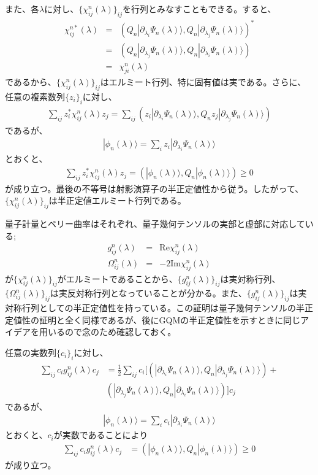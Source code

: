\documentclass[12pt]{jsbook}
\newcommand{\ra}{\rangle}
\newcommand{\pa}{\partial}
\begin{document}
また、各$\lambda$に対し、$\{\chi^{n}_{ij}(\lambda)\}_{ij}$を行列とみなすこともできる。すると、
\begin{eqnarray}
\chi^{n*}_{ij}(\lambda)&=&(Q_n|\pa_{\lambda_i}\Psi_n(\lambda)\ra,Q_n|\pa_{\lambda_j}\Psi_n(\lambda)\ra)^*\\
&=&(Q_n|\pa_{\lambda_j}\Psi_n(\lambda)\ra,Q_n|\pa_{\lambda_i}\Psi_n(\lambda)\ra)\\
&=&\chi^{n}_{ji}(\lambda)
\end{eqnarray}
であるから、$\{\chi^{n}_{ij}(\lambda)\}_{ij}$はエルミート行列、特に固有値は実である。さらに、任意の複素数列$\{z_i\}_i$に対し、
\begin{eqnarray}
\displaystyle \sum_{ij} z_i^{*}\chi^{n}_{ij}(\lambda)z_j=\displaystyle \sum_{ij} (z_i|\pa_{\lambda_i}\Psi_n(\lambda)\ra,Q_n z_j|\pa_{\lambda_j}\Psi_n(\lambda)\ra)
\end{eqnarray}
であるが、
\begin{eqnarray}
|\phi_n(\lambda)\ra = \displaystyle \sum_{i} z_i|\pa_{\lambda_i}\Psi_n(\lambda)\ra
\end{eqnarray}
とおくと、
\begin{eqnarray}
\label{SPDsingle}
\displaystyle \sum_{ij} z_i^{*}\chi^{n}_{ij}(\lambda)z_j=(|\phi_n(\lambda)\ra,Q_n|\phi_n(\lambda)\ra)\geq 0
\end{eqnarray}
が成り立つ。最後の不等号は射影演算子の半正定値性から従う。したがって、$\{\chi^{n}_{ij}(\lambda)\}_{ij}$は半正定値エルミート行列である。

量子計量とベリー曲率はそれぞれ、量子幾何テンソルの実部と虚部に対応している;
\begin{eqnarray}
    g^{n}_{ij}(\lambda)&=&\mathrm{Re} \chi^{n}_{ij}(\lambda)\\
    \Omega^n_{ij}(\lambda)&=&-2\mathrm{Im}\chi^{n}_{ij}(\lambda)
\end{eqnarray}
が$\{\chi^{n}_{ij}(\lambda)\}_{ij}$がエルミートであることから、$\{g^{n}_{ij}(\lambda)\}_{ij}$は実対称行列、$\{\Omega^{n}_{ij}(\lambda)\}_{ij}$は実反対称行列となっていることが分かる。また、$\{g^{n}_{ij}(\lambda)\}_{ij}$は実対称行列としての半正定値性を持っている。この証明は量子幾何テンソルの半正定値性の証明と全く同様であるが、後にGQMの半正定値性を示すときに同じアイデアを用いるので念のため確認しておく。

任意の実数列$\{c_i\}_i$に対し、
\begin{eqnarray}
    \displaystyle \sum_{ij}c_i g^{n}_{ij}(\lambda)c_j &=\frac{1}{2}\displaystyle \sum_{ij} c_i \Big[(|\pa_{\lambda_i}\Psi_n(\lambda)\ra,Q_n|\pa_{\lambda_j}\Psi_n(\lambda)\ra)+\\
    &(|\pa_{\lambda_j}\Psi_n(\lambda)\ra,Q_n|\pa_{\lambda_i}\Psi_n(\lambda)\ra)]c_j
\end{eqnarray}
であるが、
\begin{eqnarray}
|\phi_n(\lambda)\ra = \displaystyle \sum_{i} c_i|\pa_{\lambda_i}\Psi_n(\lambda)\ra
\end{eqnarray}
とおくと、$c_i$が実数であることにより
\begin{eqnarray}
    \displaystyle \sum_{ij}c_i g^{n}_{ij}(\lambda)c_j &=(|\phi_n(\lambda)\ra,Q_n|\phi_n(\lambda)\ra)\geq 0
\end{eqnarray}
が成り立つ。
\end{document}
